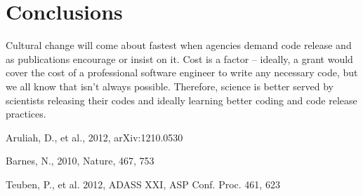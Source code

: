 \documentclass[11pt,twoside]{article}
\begin{document}
\section{Conclusions}

Cultural change will come about fastest when agencies demand code release and as publications encourage or insist on it. Cost is a factor -- ideally, a grant would cover the cost of a professional software engineer to write any necessary code, but we all know that isn't always possible. Therefore, science is better served by scientists releasing their codes and ideally learning better coding and code release practices.


\begin{references}

 Aruliah, D., et al., 2012, arXiv:1210.0530 

 Barnes, N., 2010, Nature, 467, 753

 Teuben, P., et al. 2012, ADASS XXI, ASP Conf. Proc. 461, 623

\end{references}
\end{document}
